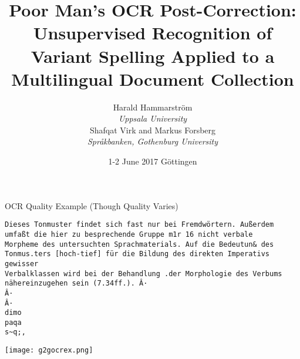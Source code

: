 \documentclass{beamer}
\title[Poor Man's OCR Post-Correction]{Poor Man's OCR Post-Correction: Unsupervised Recognition of Variant Spelling Applied to a Multilingual Document Collection}
\author[Hammarstrom]{Harald Hammarstr\"om\\\emph{Uppsala University}\\Shafqat Virk and Markus Forsberg\\\emph{Spr\aa{}kbanken, Gothenburg University}}
\date[2017 DATeCH]{1-2 June 2017 G\"ottingen}
\begin{document}
\frame{
\maketitle
}






\begin{frame}[fragile]{OCR Quality Example (Though Quality Varies)}

{\small
\begin{verbatim}
Dieses Tonmuster findet sich fast nur bei Fremdwörtern. Außerdem
umfaßt die hier zu besprechende Gruppe m1r 16 nicht verbale
Morpheme des untersuchten Sprachmaterials. Auf die Bedeutun& des
Tonmus.ters [hoch-tief] für die Bildung des direkten Imperativs gewisser
Verbalklassen wird bei der Behandlung .der Morphologie des Verbums
nähereinzugehen sein (7.34ff.). Â·
Â·
Â·
dimo
paqa
s~q;,
\end{verbatim}}

\texttt{[image: g2gocrex.png]}

\end{frame}
\end{document}

